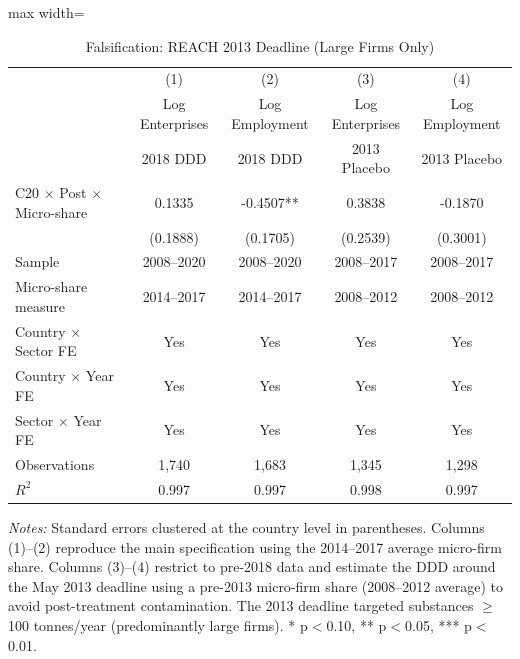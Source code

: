\begin{table}[H]
\centering
\caption{Falsification: REACH 2013 Deadline (Large Firms Only)}
\label{tab:placebo}
\begin{adjustbox}{max width=\textwidth}
\begin{tabular}{l*{4}{c}}
\toprule
 & (1) & (2) & (3) & (4) \\
 & Log Enterprises & Log Employment & Log Enterprises & Log Employment \\
 & 2018 DDD & 2018 DDD & 2013 Placebo & 2013 Placebo \\
\midrule
C20 $\times$ Post $\times$ Micro-share & 0.1335 & -0.4507** & 0.3838 & -0.1870 \\
 & (0.1888) & (0.1705) & (0.2539) & (0.3001) \\
\midrule
Sample & 2008--2020 & 2008--2020 & 2008--2017 & 2008--2017 \\
Micro-share measure & 2014--2017 & 2014--2017 & 2008--2012 & 2008--2012 \\
Country $\times$ Sector FE & Yes & Yes & Yes & Yes \\
Country $\times$ Year FE & Yes & Yes & Yes & Yes \\
Sector $\times$ Year FE & Yes & Yes & Yes & Yes \\
Observations & 1,740 & 1,683 & 1,345 & 1,298 \\
$R^2$ & 0.997 & 0.997 & 0.998 & 0.997 \\
\bottomrule
\end{tabular}
\end{adjustbox}
\par\vspace{0.3em}
{\footnotesize \textit{Notes:} Standard errors clustered at the country level in parentheses. Columns (1)--(2) reproduce the main specification using the 2014--2017 average micro-firm share. Columns (3)--(4) restrict to pre-2018 data and estimate the DDD around the May 2013 deadline using a pre-2013 micro-firm share (2008--2012 average) to avoid post-treatment contamination. The 2013 deadline targeted substances $\geq$100 tonnes/year (predominantly large firms). * p$<$0.10, ** p$<$0.05, *** p$<$0.01.}
\end{table}
